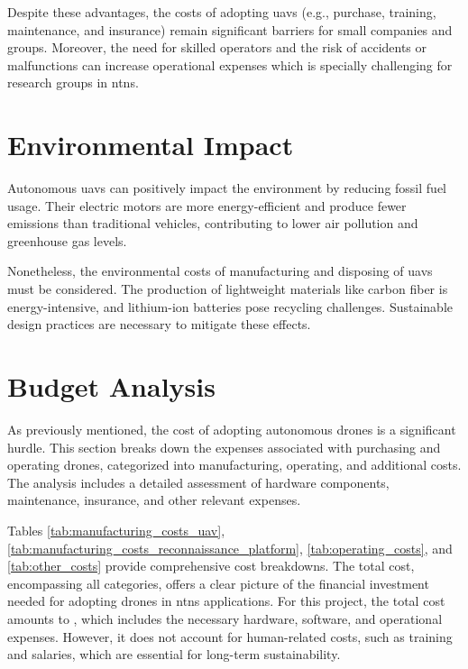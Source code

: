Despite these advantages, the costs of adopting \glspl{uav} (e.g., purchase, training, maintenance, and insurance) remain significant barriers for small companies and groups. Moreover, the need for skilled operators and the risk of accidents or malfunctions can increase operational expenses which is specially challenging for research groups in \glspl{ntn}.

\section{Environmental Impact}\label{sec:environmental_impact}

Autonomous \glspl{uav} can positively impact the environment by reducing fossil fuel usage. Their electric motors are more energy-efficient and produce fewer emissions than traditional vehicles, contributing to lower air pollution and greenhouse gas levels.

Nonetheless, the environmental costs of manufacturing and disposing of \glspl{uav} must be considered. The production of lightweight materials like carbon fiber is energy-intensive, and lithium-ion batteries pose recycling challenges. Sustainable design practices are necessary to mitigate these effects.

\section{Budget Analysis}\label{sec:budget_analysis}

As previously mentioned, the cost of adopting autonomous drones is a significant hurdle. This section breaks down the expenses associated with purchasing and operating drones, categorized into manufacturing, operating, and additional costs. The analysis includes a detailed assessment of hardware components, maintenance, insurance, and other relevant expenses.

Tables \cref{tab:manufacturing_costs_uav}, \cref{tab:manufacturing_costs_reconnaissance_platform}, \cref{tab:operating_costs}, and \cref{tab:other_costs} provide comprehensive cost breakdowns. The total cost, encompassing all categories, offers a clear picture of the financial investment needed for adopting drones in \glspl{ntn} applications. For this project, the total cost amounts to , which includes the necessary hardware, software, and operational expenses. However, it does not account for human-related costs, such as training and salaries, which are essential for long-term sustainability.

